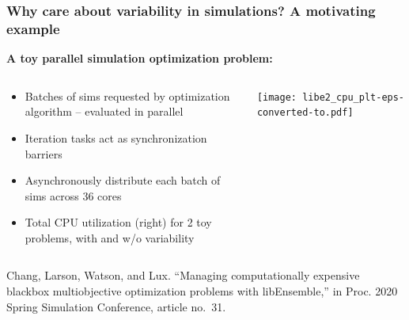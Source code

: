 \documentclass[aspectratio=169]{beamer}
\begin{document}
\begin{frame}\frametitle{Why care about variability in simulations?
	A motivating example}
	\textbf{A toy parallel simulation optimization problem:}
	\begin{columns}
	\begin{column}{0.5\textwidth}
		\begin{itemize}
			\item Batches of sims requested by optimization
				algorithm -- evaluated in parallel
			\item Iteration tasks act as
				synchronization barriers
			\item Asynchronously
				distribute each batch of sims across 36
				cores
			\item Total CPU utilization (right)
				for 2 toy problems, with and w/o
				variability
		\end{itemize}
	\end{column}
	\begin{column}{0.5\textwidth}
		\texttt{[image: libe2\_cpu\_plt-eps-converted-to.pdf]}
	\end{column}
	\end{columns}

	\par

	\medskip

	{\tiny
	Chang, Larson, Watson, and Lux.
	``Managing computationally expensive blackbox multiobjective
	optimization problems with libEnsemble,''
	in Proc. 2020 Spring Simulation Conference, article no.\ 31.\\}
\end{frame}
\end{document}
